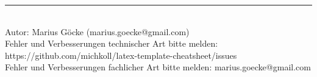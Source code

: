 \rule{0.3\linewidth}{0.25pt}
\\Autor: Marius Göcke (marius.goecke@gmail.com)
\\Fehler und Verbesserungen technischer Art bitte melden: https://github.com/michkoll/latex-template-cheatsheet/issues
\\Fehler und Verbesserungen fachlicher Art bitte melden: marius.goecke@gmail.com
\scriptsize


